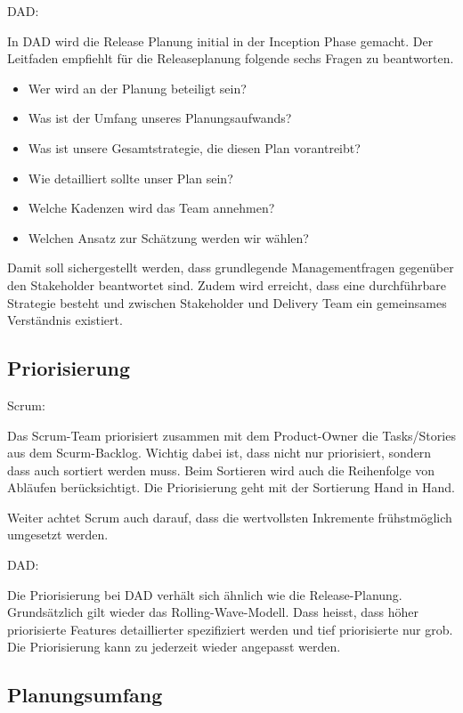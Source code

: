 {\Large DAD:} \cite{planningReleaseDad} \medskip

In DAD wird die Release Planung initial in der Inception Phase gemacht. Der Leitfaden empfiehlt für die Releaseplanung folgende sechs Fragen zu beantworten.
\begin{itemize}
	\item Wer wird an der Planung beteiligt sein?
	\item Was ist der Umfang unseres Planungsaufwands?
	\item Was ist unsere Gesamtstrategie, die diesen Plan vorantreibt?
    \item Wie detailliert sollte unser Plan sein?
    \item Welche Kadenzen wird das Team annehmen?
    \item Welchen Ansatz zur Schätzung werden wir wählen?
\end{itemize}
Damit soll sichergestellt werden, dass grundlegende Managementfragen gegenüber den Stakeholder beantwortet sind. Zudem wird erreicht, dass eine durchführbare Strategie besteht und zwischen Stakeholder und Delivery Team ein gemeinsames Verständnis existiert.


\subsection{Priorisierung}

{\Large Scrum:} \cite{planningPrioScrum} \medskip

Das Scrum-Team priorisiert zusammen mit dem Product-Owner die Tasks/Stories aus dem Scurm-Backlog. Wichtig dabei ist, dass nicht nur priorisiert, sondern dass auch sortiert werden muss. Beim Sortieren wird auch die Reihenfolge von Abläufen berücksichtigt. Die Priorisierung geht mit der Sortierung Hand in Hand. \smallskip

Weiter achtet Scrum auch darauf, dass die wertvollsten Inkremente frühstmöglich umgesetzt werden.\bigskip 

{\Large DAD:} \cite{planningPrioDad} \medskip

Die Priorisierung bei DAD verhält sich ähnlich wie die Release-Planung. Grundsätzlich gilt wieder das Rolling-Wave-Modell. Dass heisst, dass höher priorisierte Features detaillierter spezifiziert werden und tief priorisierte nur grob. Die Priorisierung kann zu jederzeit wieder angepasst werden.


\subsection{Planungsumfang}

